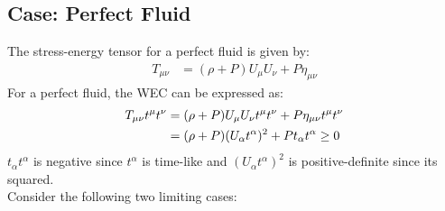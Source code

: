\documentclass[10pt]{article}
\begin{document}
        	\subsection{Case: Perfect Fluid}
        	    The stress-energy tensor for a perfect fluid is given by: 
        	    \begin{align}\label{eq:PerfectFluidTensor}
                    T_{\mu\nu} &= (\rho+P)U_{\mu}U_{\nu} + P\eta_{\mu\nu}
            	\end{align}
            	For a perfect fluid, the WEC can be expressed as:
                \begin{align}\label{eq:PerfectFluidFWEC}
                    T_{\mu\nu}t^{\mu}t^{\nu} &= (\rho+P)U_{\mu}U_{\nu}t^{\mu}t^{\nu} + P \eta_{\mu\nu}t^{\mu}t^{\nu} \notag \\
                    &= (\rho+P)(U_{\alpha}t^{\alpha})^2 + Pt_{\alpha}t^{\alpha} \geq 0
            	\end{align}
            	$t_{\alpha}t^{\alpha}$ is negative since $t^{\alpha}$ is time-like and $(U_{\alpha}t^{\alpha})^2$ is positive-definite since its squared.\\
            	Consider the following two limiting cases: 
\end{document}
